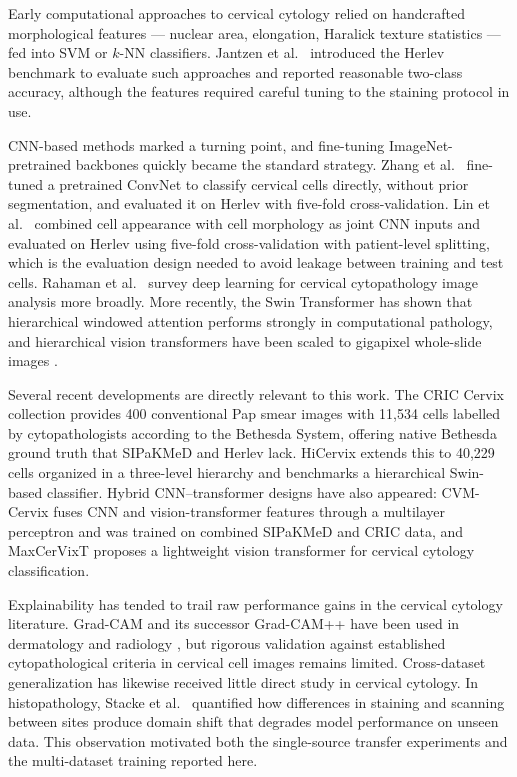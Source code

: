 \documentclass[conference]{IEEEtran}
\begin{document}
Early computational approaches to cervical cytology relied on handcrafted morphological features --- nuclear area, elongation, Haralick texture statistics --- fed into SVM or $k$-NN classifiers. Jantzen et al.\ \cite{jantzen2005} introduced the Herlev benchmark to evaluate such approaches and reported reasonable two-class accuracy, although the features required careful tuning to the staining protocol in use.

CNN-based methods marked a turning point, and fine-tuning ImageNet-pretrained backbones quickly became the standard strategy. Zhang et al.\ \cite{zhang2017deeppap} fine-tuned a pretrained ConvNet to classify cervical cells directly, without prior segmentation, and evaluated it on Herlev with five-fold cross-validation. Lin et al.\ \cite{lin2019} combined cell appearance with cell morphology as joint CNN inputs and evaluated on Herlev using five-fold cross-validation with patient-level splitting, which is the evaluation design needed to avoid leakage between training and test cells. Rahaman et al.\ \cite{rahaman2020} survey deep learning for cervical cytopathology image analysis more broadly. More recently, the Swin Transformer \cite{liu2021swin} has shown that hierarchical windowed attention performs strongly in computational pathology, and hierarchical vision transformers have been scaled to gigapixel whole-slide images \cite{chen2022hipt}.

Several recent developments are directly relevant to this work. The CRIC Cervix collection \cite{rezende2021cric} provides 400 conventional Pap smear images with 11,534 cells labelled by cytopathologists according to the Bethesda System, offering native Bethesda ground truth that SIPaKMeD and Herlev lack. HiCervix \cite{cai2024hicervix} extends this to 40,229 cells organized in a three-level hierarchy and benchmarks a hierarchical Swin-based classifier. Hybrid CNN--transformer designs have also appeared: CVM-Cervix \cite{liu2022cvmcervix} fuses CNN and vision-transformer features through a multilayer perceptron and was trained on combined SIPaKMeD and CRIC data, and MaxCerVixT \cite{pacal2024maxcervixt} proposes a lightweight vision transformer for cervical cytology classification.

Explainability has tended to trail raw performance gains in the cervical cytology literature. Grad-CAM \cite{selvaraju2017gradcam} and its successor Grad-CAM++ \cite{chattopadhay2018} have been used in dermatology \cite{esteva2017} and radiology \cite{rajpurkar2017}, but rigorous validation against established cytopathological criteria in cervical cell images remains limited. Cross-dataset generalization has likewise received little direct study in cervical cytology. In histopathology, Stacke et al.\ \cite{stacke2021domainshift} quantified how differences in staining and scanning between sites produce domain shift that degrades model performance on unseen data. This observation motivated both the single-source transfer experiments and the multi-dataset training reported here.
\end{document}
